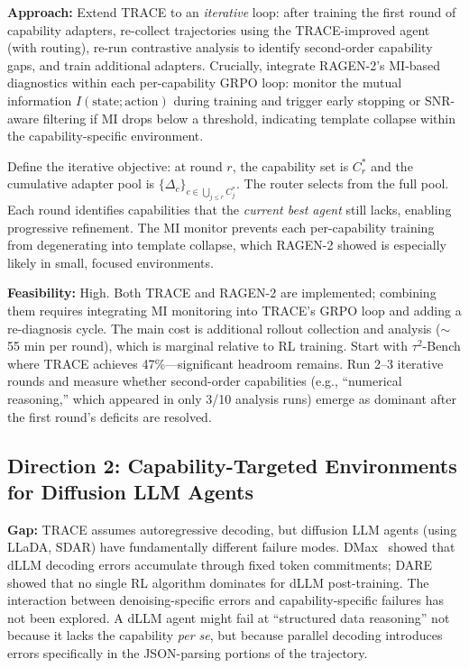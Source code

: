 \documentclass[11pt]{article}
\begin{document}
\textbf{Approach:} Extend TRACE to an \textit{iterative} loop: after training the first round of capability adapters, re-collect trajectories using the TRACE-improved agent (with routing), re-run contrastive analysis to identify second-order capability gaps, and train additional adapters. Crucially, integrate RAGEN-2's MI-based diagnostics within each per-capability GRPO loop: monitor the mutual information $I(\mathrm{state}; \mathrm{action})$ during training and trigger early stopping or SNR-aware filtering if MI drops below a threshold, indicating template collapse within the capability-specific environment.

Define the iterative objective: at round $r$, the capability set is $C^{*}_{r}$ and the cumulative adapter pool is $\{\Delta_c\}_{c \in \bigcup_{j \leq r} C^{*}_{j}}$. The router selects from the full pool. Each round identifies capabilities that the \textit{current best agent} still lacks, enabling progressive refinement. The MI monitor prevents each per-capability training from degenerating into template collapse, which RAGEN-2 showed is especially likely in small, focused environments.

\textbf{Feasibility:} High. Both TRACE and RAGEN-2 are implemented; combining them requires integrating MI monitoring into TRACE's GRPO loop and adding a re-diagnosis cycle. The main cost is additional rollout collection and analysis ($\sim$55 min per round), which is marginal relative to RL training. Start with $\tau^{2}$-Bench where TRACE achieves 47\%---significant headroom remains. Run 2--3 iterative rounds and measure whether second-order capabilities (e.g., ``numerical reasoning,'' which appeared in only 3/10 analysis runs) emerge as dominant after the first round's deficits are resolved.

\subsection{Direction 2: Capability-Targeted Environments for Diffusion LLM Agents}

\textbf{Gap:} TRACE assumes autoregressive decoding, but diffusion LLM agents (using LLaDA, SDAR) have fundamentally different failure modes. DMax~\cite{dmax} showed that dLLM decoding errors accumulate through fixed token commitments; DARE~\cite{dare} showed that no single RL algorithm dominates for dLLM post-training. The interaction between denoising-specific errors and capability-specific failures has not been explored. A dLLM agent might fail at ``structured data reasoning'' not because it lacks the capability \textit{per se}, but because parallel decoding introduces errors specifically in the JSON-parsing portions of the trajectory.
\end{document}
